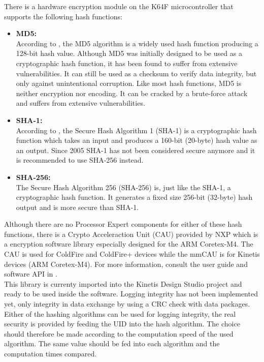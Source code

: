 There is a hardware encryption module on the K64F microcontroller that supports the following hash functions: \begin{itemize}
    \item \textbf{MD5:}\\
    According to \cite{MD5_Wikipedia}, the MD5 algorithm is a widely used hash function producing a 128-bit hash value. Although MD5 was initially designed to be used as a cryptographic hash function, it has been found to suffer from extensive vulnerabilities. It can still be used as a checksum to verify data integrity, but only against unintentional corruption. Like most hash functions, MD5 is neither encryption nor encoding. It can be cracked by a brute-force attack and suffers from extensive vulnerabilities.
    \item \textbf{SHA-1:}\\
    According to \cite{SHA1_Wikipedia}, the Secure Hash Algorithm 1 (SHA-1) is a cryptographic hash function which takes an input and produces a 160-bit (20-byte) hash value as an output. Since 2005 SHA-1 has not been considered secure anymore and it is recommended to use SHA-256 instead.
    \item \textbf{SHA-256:}\\
    The Secure Hash Algorithm 256 (SHA-256) is, just like the SHA-1, a cryptographic hash function. It generates a fixed size 256-bit (32-byte) hash output and is more secure than SHA-1.
\end{itemize}
%
Although there are no Processor Expert components for either of these hash functions, there is a Crypto Acceleraction Unit (CAU) provided by NXP which is a encryption software library especially designed for the ARM Coretex-M4. The CAU is used for ColdFire and ColdFire+ devices while the mmCAU is for Kinetis devices (ARM Coretex-M4). For more information, consult the user guide and software API in \cite{CAU_UserGuide}.\\
This library is currenty imported into the Kinetis Design Studio project and ready to be used inside the software. Logging integrity has not been implemented yet, only integrity in data exchange by using a CRC check with data packages. Either of the hashing algorithms can be used for logging integrity, the real security is provided by feeding the UID into the hash algorithm. The choice should therefore be made according to the computation speed of the used algorithm. The same value should be fed into each algorithm and the computation times compared.
%
%
%
%
%
%
%
%
%

